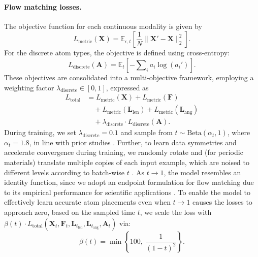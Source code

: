 \documentclass{article}
\theoremstyle{plain}
\theoremstyle{definition}
\theoremstyle{remark}
\begin{document}
\paragraph{Flow matching losses.} The objective function for each continuous modality is given by
\begin{equation}
    L_{\text{metric}}(\bm{X}) = \mathbb{E}_{\epsilon,t} \left[ \frac{1}{N} \| \bm{X}' - \bm{X} \|_2^2 \right].
\end{equation}
For the discrete atom types, the objective is defined using cross-entropy:
\begin{equation}
    L_{\text{discrete}}(\bm{A}) = \mathbb{E}_{t} \left[ -\sum\nolimits_i a_i \log(a_i') \right].
\end{equation}
These objectives are consolidated into a multi-objective framework, employing a weighting factor $\lambda_{\text{discrete}} \in [0, 1]$, expressed as
\begin{equation}
    \begin{split}
        L_{\text{total}} &= L_{\text{metric}}(\bm{X}) + L_{\text{metric}}(\bm{F}) \\
        &\quad + L_{\text{metric}}(\bm{L}_\text{len}) + L_{\text{metric}}(\bm{L}_\text{ang}) \\
        &\quad + \lambda_{\text{discrete}} \cdot L_{\text{discrete}}(\bm{A}).
    \end{split}
\end{equation}
During training, we set $\lambda_{\text{discrete}} = 0.1$ and sample from $t \sim \text{Beta}(\alpha_t, 1)$, where $\alpha_t=1.8$, in line with prior studies \citep{geffner2025proteina, vonessen2025tabasco}. Further, to learn data symmetries and accelerate convergence during training, we randomly rotate and (for periodic materials) translate multiple copies of each input example, which are noised to different levels according to batch-wise $t$ \citep{abramson2024accurate}. As $t \to 1$, the model resembles an identity function, since we adopt an endpoint formulation for flow matching due to its empirical performance for scientific applications \citep{stark2024harmonic}. To enable the model to effectively learn accurate atom placements even when $t \to 1$ causes the losses to approach zero, based on the sampled time $t$, we scale the loss with $\beta(t) \cdot L_{\text{total}}(\bm{X}_t, \bm{F}_t, \bm{L}_{t_\text{len}}, \bm{L}_{t_\text{ang}}, \bm{A}_t)$ via:
\begin{equation}
    \textstyle
    \beta(t) = \min \left\{ 100,\ \frac{1}{(1-t)^2} \right\}.
\end{equation}
\end{document}
